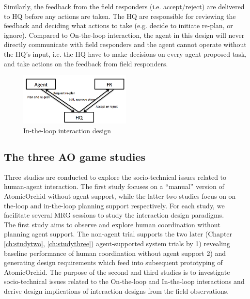 Similarly, the feedback from the field responders (i.e. accept/reject) are delivered to HQ before any actions are taken. The HQ are responsible for reviewing the feedback and deciding what actions to take (e.g. decide to initiate re-plan, or ignore). Compared to On-the-loop interaction, the agent in this design will never directly communicate with field responders and the agent cannot operate without the HQ's input, i.e. the HQ have to make decisions on every agent proposed task, and take actions on the feedback from field responders. \\

\begin{figure}[h]
  \centering
  \includegraphics[width=0.5\textwidth]{img/approach/InTheLoop}
  \caption{In-the-loop interaction design}
  \label{fig:InTheLoop}
\end{figure}


\subsection{The three AO game studies}
Three studies are conducted to explore the socio-technical issues related to human-agent interaction. The first study focuses on a ``manual'' version of AtomicOrchid without agent support, while the latter two studies focus on on-the-loop and in-the-loop planning support respectively. For each study, we facilitate several \acf{MRG} sessions to study the interaction design paradigms. \\ 

The first study aims to observe and explore human coordination without planning agent support. The non-agent trial supports the two later (Chapter \ref{ch:studytwo}, \ref{ch:studythree}) agent-supported system trials by 1) revealing baseline performance of human coordination without agent support 2) and generating design requirements which feed into subsequent prototyping of AtomicOrchid. The purpose of the second and third studies is to investigate socio-technical issues related to the On-the-loop and In-the-loop interactions and derive design implications of interaction designs from the field observations.\\

